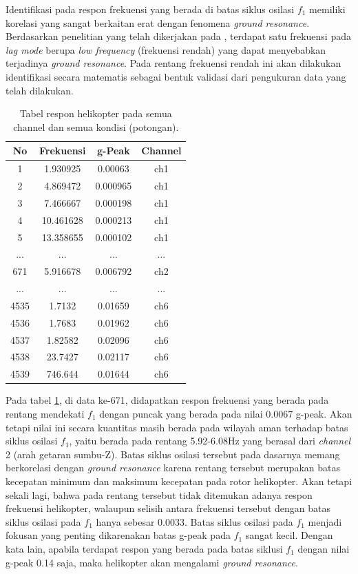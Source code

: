 Identifikasi pada respon frekuensi yang berada di batas siklus osilasi $f_1$ memiliki korelasi yang sangat berkaitan erat dengan fenomena \textit{ground resonance}. Berdasarkan penelitian yang telah dikerjakan pada \cite{Eckert2007AnalyticalAA}, terdapat satu frekuensi pada \textit{lag mode} berupa \textit{low frequency} (frekuensi rendah) yang dapat menyebabkan terjadinya \textit{ground resonance}. Pada rentang frekuensi rendah ini akan dilakukan identifikasi secara matematis sebagai bentuk validasi dari pengukuran data yang telah dilakukan.

\begin{table}[h]
	\centering
	\caption{Tabel respon helikopter pada semua channel dan semua kondisi (potongan).}
	\label{tb:list_all_data_sort}
		\begin{tabular}{|c|c|c|c|}
			\hline
			No & Frekuensi & g-Peak & Channel \\ \hline
			1 & 1.930925 & 0.00063 & ch1 \\ \hline
			2 & 4.869472 & 0.000965 & ch1 \\ \hline
			3 & 7.466667 & 0.000198 & ch1 \\ \hline
			4 & 10.461628 & 0.000213 & ch1 \\ \hline
			5 & 13.358655 & 0.000102 & ch1 \\ \hline
			... & ... & ... & ... \\ \hline
			671 & 5.916678 & 0.006792 & ch2 \\ \hline
			... & ... & ... & ... \\ \hline
			4535 & 1.7132 & 0.01659 & ch6 \\ \hline
			4536 & 1.7683 & 0.01962 & ch6 \\ \hline
			4537 & 1.82582 & 0.02096 & ch6 \\ \hline
			4538 & 23.7427 & 0.02117 & ch6 \\ \hline
			4539 & 746.644 & 0.01644 & ch6 \\ \hline
		\end{tabular}%
\end{table}

Pada tabel \ref{tb:list_all_data_sort}, di data ke-671, didapatkan respon frekuensi yang berada pada rentang mendekati $f_1$ dengan puncak yang berada pada nilai 0.0067 g-peak. Akan tetapi nilai ini secara kuantitas masih berada pada wilayah aman terhadap batas siklus osilasi $f_1$, yaitu berada pada rentang 5.92-6.08Hz yang berasal dari \textit{channel} 2 (arah getaran sumbu-Z). Batas siklus osilasi tersebut pada dasarnya memang berkorelasi dengan \textit{ground resonance} karena rentang tersebut merupakan batas kecepatan minimum dan maksimum kecepatan pada rotor helikopter. Akan tetapi sekali lagi, bahwa pada rentang tersebut tidak ditemukan adanya respon frekuensi helikopter, walaupun selisih antara frekuensi tersebut dengan batas siklus osilasi pada $f_1$ hanya sebesar 0.0033. Batas siklus osilasi pada $f_1$ menjadi fokusan yang penting dikarenakan batas g-peak pada $f_1$ sangat kecil. Dengan kata lain, apabila terdapat respon yang berada pada batas siklusi $f_1$ dengan nilai g-peak 0.14 saja, maka helikopter akan mengalami \textit{ground resonance}. 

